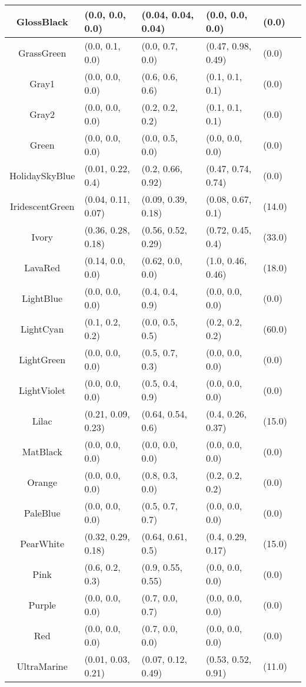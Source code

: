 \begin{table}[H]
\begin{small}
\begin{center}
\begin{tabular}{|c||l|l|l|l|l|}
GlossBlack & (0.0, 0.0, 0.0) & (0.04, 0.04, 0.04) & (0.0, 0.0, 0.0) & (0.0) \\ \hline
GrassGreen & (0.0, 0.1, 0.0) & (0.0, 0.7, 0.0) & (0.47, 0.98, 0.49) & (0.0) \\ \hline
Gray1 & (0.0, 0.0, 0.0) & (0.6, 0.6, 0.6) & (0.1, 0.1, 0.1) & (0.0) \\ \hline
Gray2 & (0.0, 0.0, 0.0) & (0.2, 0.2, 0.2) & (0.1, 0.1, 0.1) & (0.0) \\ \hline
Green & (0.0, 0.0, 0.0) & (0.0, 0.5, 0.0) & (0.0, 0.0, 0.0) & (0.0) \\ \hline
HolidaySkyBlue & (0.01, 0.22, 0.4) & (0.2, 0.66, 0.92) & (0.47, 0.74, 0.74) & (0.0) \\ \hline
IridescentGreen & (0.04, 0.11, 0.07) & (0.09, 0.39, 0.18) & (0.08, 0.67, 0.1) & (14.0) \\ \hline
Ivory & (0.36, 0.28, 0.18) & (0.56, 0.52, 0.29) & (0.72, 0.45, 0.4) & (33.0) \\ \hline
LavaRed & (0.14, 0.0, 0.0) & (0.62, 0.0, 0.0) & (1.0, 0.46, 0.46) & (18.0) \\ \hline
LightBlue & (0.0, 0.0, 0.0) & (0.4, 0.4, 0.9) & (0.0, 0.0, 0.0) & (0.0) \\ \hline
LightCyan & (0.1, 0.2, 0.2) & (0.0, 0.5, 0.5) & (0.2, 0.2, 0.2) & (60.0) \\ \hline
LightGreen & (0.0, 0.0, 0.0) & (0.5, 0.7, 0.3) & (0.0, 0.0, 0.0) & (0.0) \\ \hline
LightViolet & (0.0, 0.0, 0.0) & (0.5, 0.4, 0.9) & (0.0, 0.0, 0.0) & (0.0) \\ \hline
Lilac & (0.21, 0.09, 0.23) & (0.64, 0.54, 0.6) & (0.4, 0.26, 0.37) & (15.0) \\ \hline
MatBlack & (0.0, 0.0, 0.0) & (0.0, 0.0, 0.0) & (0.0, 0.0, 0.0) & (0.0) \\ \hline
Orange & (0.0, 0.0, 0.0) & (0.8, 0.3, 0.0) & (0.2, 0.2, 0.2) & (0.0) \\ \hline
PaleBlue & (0.0, 0.0, 0.0) & (0.5, 0.7, 0.7) & (0.0, 0.0, 0.0) & (0.0) \\ \hline
PearWhite & (0.32, 0.29, 0.18) & (0.64, 0.61, 0.5) & (0.4, 0.29, 0.17) & (15.0) \\ \hline
Pink & (0.6, 0.2, 0.3) & (0.9, 0.55, 0.55) & (0.0, 0.0, 0.0) & (0.0) \\ \hline
Purple & (0.0, 0.0, 0.0) & (0.7, 0.0, 0.7) & (0.0, 0.0, 0.0) & (0.0) \\ \hline
Red & (0.0, 0.0, 0.0) & (0.7, 0.0, 0.0) & (0.0, 0.0, 0.0) & (0.0) \\ \hline
UltraMarine & (0.01, 0.03, 0.21) & (0.07, 0.12, 0.49) & (0.53, 0.52, 0.91) & (11.0) \\ \hline

\end{tabular}
\end{center}
\end{small}
\end{table}
